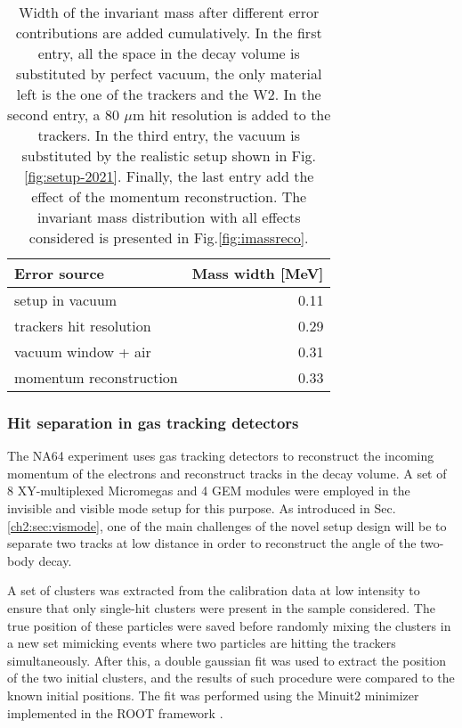 \begin{center}
  \begin{table}[bth!]
    \centering
    \begin{tabular}{|l|r|}
      \hline
      Error source & Mass width [MeV]\\
      \hline
      setup in vacuum & 0.11\\
      trackers hit resolution & 0.29\\
      vacuum window + air & 0.31\\
      momentum reconstruction & 0.33\\
      \hline
    \end{tabular}
    \label{tab:imass-width}
    \caption[Error budget for the invariant mass in 2021 setup]{Width of the invariant mass after different error contributions are added cumulatively. In the first entry, all the space in the decay volume is substituted by perfect vacuum, the only material left is the one of the trackers and the W2. In the second entry, a 80 $\mu$m hit resolution is added to the trackers. In the third entry, the vacuum is substituted by the realistic setup shown in Fig.\ref{fig:setup-2021}. Finally, the last entry add the effect of the momentum reconstruction. The invariant mass distribution with all effects considered is presented in Fig.\ref{fig:imassreco}.}
  \end{table}
\end{center}

\subsubsection{Hit separation in gas tracking detectors}
\label{ch5:sec:separ-hit-micr}

The NA64 experiment uses gas tracking detectors to reconstruct the incoming momentum of the electrons and reconstruct tracks in the decay volume. A set of 8 XY-multiplexed Micromegas and 4 GEM modules were employed in the invisible and visible mode setup for this purpose. As introduced in Sec.\ref{ch2:sec:vismode}, one of the main challenges of the novel setup design will be to separate two tracks at low distance in order to reconstruct the angle of the two-body decay.

A set of clusters was extracted from the calibration data at low intensity to ensure that only single-hit clusters were present in the sample considered. The true position of these particles were saved before randomly mixing the clusters in a new set mimicking events where two particles are hitting the trackers simultaneously. After this, a double gaussian fit was used to extract the position of the two initial clusters, and the results of such procedure were compared to the known initial positions. The fit was performed using the Minuit2 minimizer implemented in the ROOT framework \cite{root}.

